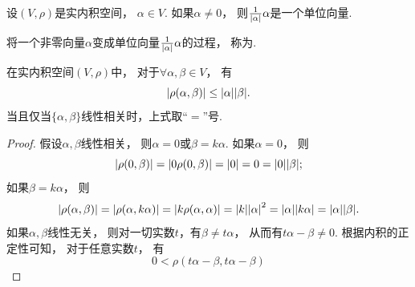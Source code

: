 \begin{property}
设\((V,\rho)\)是实内积空间，
\(\alpha \in V\).
如果\(\alpha\neq0\)，
则\(\frac1{\abs{\alpha}} \alpha\)是一个单位向量.
\end{property}
\begin{remark}
将一个非零向量\(\alpha\)变成单位向量\(\frac1{\abs{\alpha}} \alpha\)的过程，
称为.
\end{remark}

\begin{theorem}
在实内积空间\((V,\rho)\)中，
对于\(\forall \alpha,\beta \in V\)，
有\begin{equation}
	\abs{\rho(\alpha,\beta)} \leq \abs{\alpha} \abs{\beta}.
\end{equation}
当且仅当\(\{\alpha,\beta\}\)线性相关时，上式取“\(=\)”号.
\begin{proof}
假设\(\alpha,\beta\)线性相关，
则\(\alpha = 0\)或\(\beta = k \alpha\).
如果\(\alpha = 0\)，
则\begin{equation*}
	\abs{\rho(0,\beta)}
	= \abs{0 \rho(0,\beta)}
	= \abs{0}
	= 0
	= \abs{0} \abs{\beta};
\end{equation*}
如果\(\beta = k \alpha\)，
则\begin{equation*}
	\abs{\rho(\alpha,\beta)}
	= \abs{\rho(\alpha,k \alpha)}
	= \abs{k \rho(\alpha,\alpha)}
	= \abs{k} \abs{\alpha}^2
	= \abs{\alpha} \abs{k \alpha}
	= \abs{\alpha} \abs{\beta}.
\end{equation*}
如果\(\alpha,\beta\)线性无关，
则对一切实数\(t\)，有\(\beta \neq t \alpha\)，
从而有\(t \alpha - \beta \neq 0\).
根据内积的正定性可知，
对于任意实数\(t\)，
有\begin{equation*}
	0 < \rho(t \alpha - \beta, t \alpha - \beta)

\end{equation*}
\end{proof}
\end{theorem}
